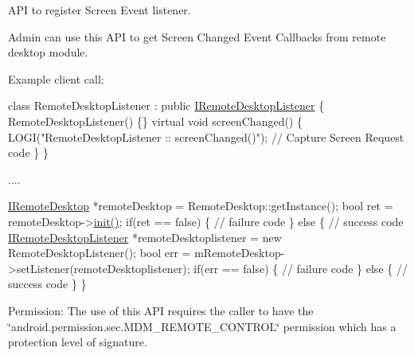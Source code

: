 \-A\-P\-I to register \-Screen \-Event listener. 

\-Admin can use this \-A\-P\-I to get \-Screen \-Changed \-Event \-Callbacks from remote desktop module. 

\-Example client call\-:


\begin{DoxyPre}
  class RemoteDesktopListener : public \hyperlink{classandroid_1_1IRemoteDesktopListener}{IRemoteDesktopListener} \{
      RemoteDesktopListener() \{\}
      virtual void screenChanged() \{
	        LOGI("RemoteDesktopListener :: screenChanged()");
          // Capture Screen Request code
      \}
  \}\end{DoxyPre}



\begin{DoxyPre}  ....\end{DoxyPre}



\begin{DoxyPre}  \hyperlink{classandroid_1_1IRemoteDesktop}{IRemoteDesktop} *remoteDesktop = RemoteDesktop::getInstance();
  bool ret = remoteDesktop->\hyperlink{classandroid_1_1IRemoteDesktop_a5792cf8c7fa9eeb8e21f39927d0fed1e}{init()};
  if(ret == false)  \{
     // failure code
  \} else \{
     // success code	 
     \hyperlink{classandroid_1_1IRemoteDesktopListener}{IRemoteDesktopListener} *remoteDesktoplistener = new RemoteDesktopListener();
     bool err = mRemoteDesktop->setListener(remoteDesktoplistener);
     if(err == false)  \{
         // failure code
     \} else \{
         // success code
     \}
  \}
 \end{DoxyPre}


\begin{DoxyParagraph}{\-Permission\-: }
\-The use of this \-A\-P\-I requires the caller to have the \char`\"{}android.\-permission.\-sec.\-M\-D\-M\-\_\-\-R\-E\-M\-O\-T\-E\-\_\-\-C\-O\-N\-T\-R\-O\-L\char`\"{} permission which has a protection level of signature.
\end{DoxyParagraph}

